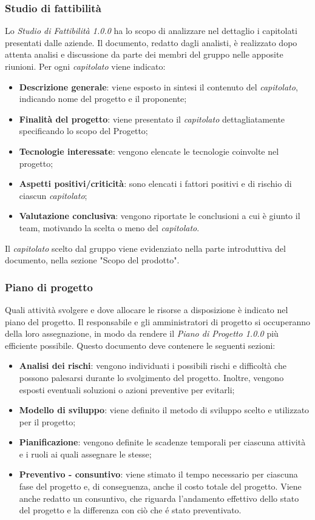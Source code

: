 \subsubsection{Studio di fattibilità}
Lo \textit{Studio di Fattibilità 1.0.0\doc} ha lo scopo di analizzare nel dettaglio i capitolati presentati dalle aziende. Il documento,  redatto dagli analisti, è realizzato dopo attenta analisi e discussione da parte dei membri del gruppo nelle apposite riunioni. Per ogni \textit{capitolato\glo} viene indicato:
\begin{itemize}
  \item \textbf{Descrizione generale}: viene esposto in sintesi il contenuto del \textit{capitolato\glos}, indicando nome del progetto e il proponente;
  \item \textbf{Finalità del progetto}: viene presentato il \textit{capitolato\glo} dettagliatamente specificando lo scopo del Progetto;
  \item \textbf{Tecnologie interessate}: vengono elencate le tecnologie coinvolte nel progetto;
  \item \textbf{Aspetti positivi/criticità}: sono elencati i fattori positivi e di rischio di ciascun \textit{capitolato\glos};
  \item \textbf{Valutazione conclusiva}: vengono riportate le conclusioni a cui è giunto il team, motivando la scelta o meno del \textit{capitolato\glos}.
\end{itemize}
Il \textit{capitolato\glo} scelto dal gruppo viene evidenziato nella parte introduttiva del documento, nella sezione "Scopo del prodotto".
\subsubsection{Piano di progetto}
Quali attività svolgere e dove allocare le risorse a disposizione è indicato nel piano del progetto. Il responsabile e gli amministratori di progetto si occuperanno della loro assegnazione, in modo da rendere il \textit{Piano di Progetto 1.0.0\doc} più efficiente possibile. Questo documento deve contenere le seguenti sezioni:
\begin{itemize}
  \item \textbf{Analisi dei rischi}: vengono individuati i possibili rischi e difficoltà che possono palesarsi durante lo svolgimento del progetto. Inoltre, vengono esposti eventuali soluzioni o azioni preventive per evitarli;
  \item \textbf{Modello di sviluppo}: viene definito il metodo di sviluppo scelto e utilizzato per il progetto;
  \item \textbf{Pianificazione}: vengono definite le scadenze temporali per ciascuna attività e i ruoli ai quali assegnare le stesse;
  \item \textbf{Preventivo - consuntivo}: viene stimato il tempo necessario per ciascuna fase del progetto e, di conseguenza, anche il costo totale del progetto. Viene anche redatto un consuntivo, che riguarda l'andamento effettivo dello stato del progetto e la differenza con ciò che é stato preventivato.
\end{itemize}
